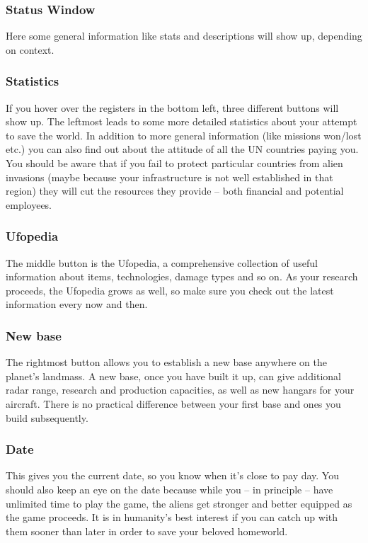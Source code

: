 \newpage

\subsubsection{Status Window}
Here some general information like stats and descriptions will show up, depending on context.

\subsubsection{Statistics}
If you hover over the registers in the bottom left, three different buttons will show up. The leftmost leads to some more detailed statistics about your attempt to save the world. In addition to more general information (like missions won/lost etc.) you can also find out about the attitude of all the UN countries paying you. You should be aware that if you fail to protect particular countries from alien invasions (maybe because your infrastructure is not well established in that region) they will cut the resources they provide -- both financial and potential employees.

\subsubsection{Ufopedia}
The middle button is the Ufopedia, a comprehensive collection of useful information about items, technologies, damage types and so on. As your research proceeds, the Ufopedia grows as well, so make sure you check out the latest information  every now and then.

\subsubsection{New base}
The rightmost button allows you to establish a new base anywhere on the planet's landmass. A new base, once you have built it up, can give additional radar range, research and production capacities, as well as new hangars for your aircraft.  There is no practical difference between your first base and ones you build subsequently.

\subsubsection{Date}
This gives you the current date, so you know when it's close to pay day. You should also keep an eye on the date because while you -- in principle -- have unlimited time to play the game, the aliens get stronger and better equipped as the game proceeds. It is in humanity's best interest if you can catch up with them sooner than later in order to save your beloved homeworld.

